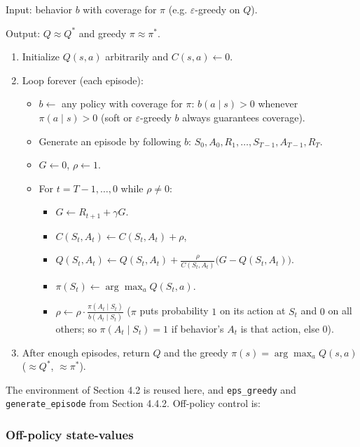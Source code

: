\begin{implnote}
Input: behavior $b$ with coverage for $\pi$ (e.g. $\varepsilon$-greedy on $Q$).

Output: $Q\approx Q^*$ and greedy $\pi\approx\pi^*$.

\begin{enumerate}
\item Initialize $Q(s,a)$ arbitrarily and $C(s,a)\leftarrow 0$.
\item Loop forever (each episode):
\begin{itemize}
\item $b\leftarrow$ any policy with coverage for $\pi$: $b(a\mid s)>0$ whenever $\pi(a\mid s)>0$ (soft or $\varepsilon$-greedy $b$ always guarantees coverage).
\item Generate an episode by following $b$: $S_0,A_0,R_1,\ldots,S_{T-1},A_{T-1},R_T$.
\item $G\leftarrow 0$, $\rho\leftarrow 1$.
\item For $t=T{-}1,\ldots,0$ while $\rho\neq 0$:
\begin{itemize}
\item $G\leftarrow R_{t+1}+\gamma G$.
\item $C(S_t,A_t)\leftarrow C(S_t,A_t)+\rho$,
\item $Q(S_t,A_t)\leftarrow Q(S_t,A_t)+\frac{\rho}{C(S_t,A_t)}\bigl(G-Q(S_t,A_t)\bigr)$.
\item $\pi(S_t)\leftarrow\arg\max_a Q(S_t,a)$.
\item $\rho\leftarrow\rho\cdot\frac{\pi(A_t\mid S_t)}{b(A_t\mid S_t)}$ ($\pi$ puts probability $1$ on its action at $S_t$ and $0$ on all others; so $\pi(A_t\mid S_t)=1$ if behavior's $A_t$ is that action, else $0$).
\end{itemize}
\end{itemize}
\item After enough episodes, return $Q$ and the greedy $\pi(s)=\arg\max_a Q(s,a)$ ($\approx Q^*$, $\approx\pi^*$).
\end{enumerate}

\end{implnote}

The environment of Section 4.2 is reused here, and \texttt{eps\_greedy} and \texttt{generate\_episode} from Section 4.4.2. Off-policy control is:




\subsubsection*{Off-policy state-values}

